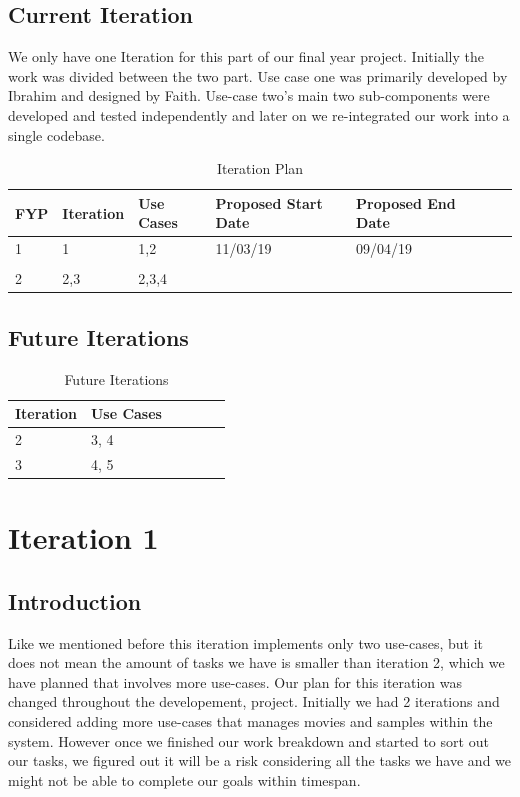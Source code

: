 \documentclass[12pt,a4paper,man]{report}
\begin{document}
\section{Current Iteration}
\label{sec:org71f5a46}
We only have one Iteration for this part of our final year project. Initially the work was divided between the two part. Use case one was primarily developed by Ibrahim and designed by Faith. Use-case two's main two sub-components were developed and tested independently and later on we re-integrated our work into a single codebase.

\begin{table}[htbp]
\caption{\label{table:iterplan}
Iteration Plan}
\centering
\begin{tabular}{|l|l|l|l|l|lp{3cm}|}
\hline
\textbf{FYP} & \textbf{Iteration} & \textbf{Use Cases} & \textbf{Proposed Start Date} & \textbf{Proposed End Date}\\
\hline
1 & 1 & 1,2 & 11/03/19 & 09/04/19\\
 &  &  &  & \\
\hline
2 & 2,3 & 2,3,4 &  & \\
\hline
\end{tabular}
\end{table}


\section{Future Iterations}
\label{sec:orgceb23e5}

\begin{table}[htbp]
\caption{\label{table:fuiterplan}
Future Iterations}
\centering
\begin{tabular}{|l|l|l|l|lp{3cm}|}
\hline
\textbf{Iteration} & \textbf{Use Cases} \footnotemark\\
\hline
2 & 3, 4\\
3 & 4, 5\\
\hline
\end{tabular}
\end{table}


\chapter{Iteration 1}
\label{sec:orgc5805fa}
\section{Introduction}
\label{sec:orgabf6ecb}
Like we mentioned before this iteration implements only two use-cases, but it does not mean the amount of tasks we have is smaller than iteration 2, which we have planned that involves more use-cases. Our plan for this iteration was changed throughout the developement, project. Initially we had 2 iterations and considered adding more use-cases that manages movies and samples within the system. However once we finished our work breakdown and started to sort out our tasks, we figured out it will be a risk considering all the tasks we have and we might not be able to complete our goals within timespan. 
\end{document}
